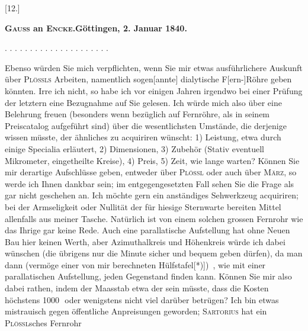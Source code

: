 \clearpage\begingroup

\begin{center}
[12.]\par\medskip
\textbf{\textsc{Gauss} an \textsc{Encke}.\quad Göttingen, 2. Januar 1840.}
\end{center}
\noindent . . . . . . . . . . . . . . . . . . . . .\par
\noindent\hspace*{\parindent}Ebenso würden Sie mich verpflichten, wenn Sie mir etwas ausführlichere Auskunft über \textsc{Plössls} Arbeiten, namentlich sogen[annte] dialytische F[ern-]Röhre geben könnten. Irre ich nicht, so habe ich vor einigen Jahren irgendwo bei einer Prüfung der letztern eine Bezugnahme auf Sie gelesen. Ich würde mich also über eine Belehrung freuen (besonders wenn bezüglich auf  Fernröhre, als in seinem Preiscatalog aufgeführt sind) über die wesentlichsten Umstände, die derjenige wissen müsste, der ähnliches zu acquiriren wünscht: 1) Leistung, etwa durch einige Specialia erläutert, 2) Dimensionen, 3) Zubehör (Stativ eventuell Mikrometer, eingetheilte Kreise), 4) Preis, 5) Zeit, wie lange warten? Können Sie mir derartige Aufschlüsse geben, entweder über \textsc{Plössl} oder auch über \textsc{März}, so werde ich Ihnen dankbar sein; im entgegengesetzten Fall sehen Sie die Frage als gar nicht geschehen an. Ich möchte gern ein anständiges Sehwerkzeug acquiriren; bei der Armseligkeit oder Nullität der für hiesige Sternwarte bereiten Mittel allenfalls aus meiner Tasche. Natürlich ist von einem solchen grossen Fernrohr wie das Ihrige gar keine Rede. Auch eine parallatische Aufstellung hat ohne Neuen Bau hier keinen Werth, aber Azimuthalkreis und Höhenkreis würde ich dabei wünschen (die übrigens nur die Minute sicher und bequem geben dürfen), da man dann (vermöge einer von mir berechneten Hülfstafel[*)])\begingroup\renewcommand{\thefootnote}{}\endgroup\ , wie mit einer parallatischen Aufstellung, jeden Gegenstand finden kann. Können Sie mir also dabei rathen, indem der Maasstab etwa der sein müsste, dass die Kosten höchstens 1000\,\DioptrikCurrencyTwelve\ oder wenigstens nicht viel darüber betrügen? Ich bin etwas mistrauisch gegen öffentliche Anpreisungen geworden; \textsc{Sartorius} hat ein \textsc{Plössl}sches Fernrohr
